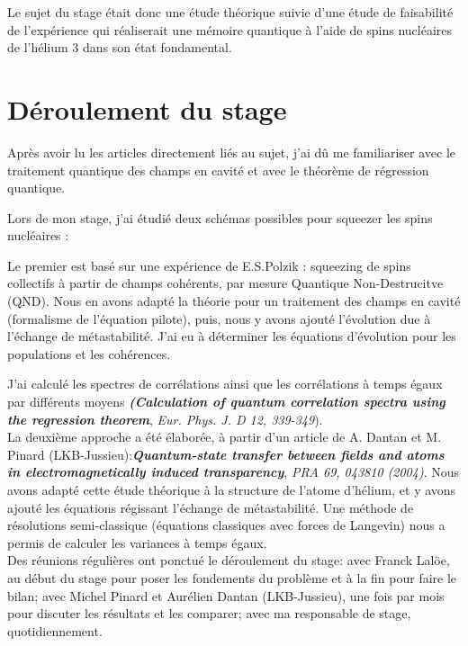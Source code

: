 \documentclass[a4paper,10pt]{article}
\begin{document}
Le sujet du stage \'{e}tait donc une \'{e}tude th\'{e}orique suivie d'une \'{e}tude de
faisabilit\'{e} de l'exp\'{e}rience qui r\'{e}aliserait une m\'{e}moire quantique \`{a} l'aide de
spins nucl\'{e}aires de l'h\'{e}lium 3 dans son \'{e}tat fondamental.


\section{D\'{e}roulement du stage}
Apr\`{e}s avoir lu les articles directement li\'{e}s au sujet, j'ai d\^{u} me familiariser
avec le traitement quantique des champs en cavit\'{e} et avec le th\'{e}or\`{e}me de
r\'{e}gression quantique.

Lors de mon stage, j'ai \'etudi\'e deux sch\'emas possibles pour squeezer les
spins nucl\'eaires :

Le premier est bas\'e sur une exp\'{e}rience de E.S.Polzik : squeezing
de spins collectifs \`{a} partir de champs coh\'{e}rents, par mesure Quantique
Non-Destrucitve (QND). 
Nous en avons adapt\'{e} la th\'{e}orie pour un traitement des
champs en cavit\'{e} (formalisme de l'\'{e}quation pilote), puis, nous y avons ajout\'{e}
l'\'{e}volution due \`{a} l'\'{e}change de m\'{e}tastabilit\'{e}. J'ai eu \`{a} d\'{e}terminer les
\'{e}quations d'\'{e}volution pour les populations et les coh\'{e}rences.

J'ai calcul\'{e} les spectres de corr\'{e}lations ainsi que les corr\'{e}lations \`{a} temps
\'{e}gaux par diff\'{e}rents moyens \textit{\textbf{(Calculation of quantum correlation
spectra using the regression theorem}}, \textit{Eur. Phys. J. D 12, 339-349}).\\

La deuxi\`eme approche a \'{e}t\'{e} \'elabor\'ee, \`{a} partir d'un article de
A. Dantan et M. Pinard (LKB-Jussieu):\textbf{\textit{Quantum-state transfer
between fields and atoms in electromagnetically induced transparency}},
\textit{PRA 69, 043810 (2004)}. Nous avons adapt\'{e} cette \'{e}tude th\'{e}orique \`{a} la
structure de l'atome d'h\'{e}lium, et y avons ajout\'{e} les \'{e}quations r\'{e}gissant
l'\'{e}change de m\'{e}tastabilit\'{e}.
Une m\'{e}thode de r\'{e}solutions semi-classique (\'{e}quations classiques avec forces de
Langevin) nous a permis de calculer les variances \`{a} temps \'{e}gaux.\\

Des r\'{e}unions r\'{e}guli\`{e}res ont ponctu\'{e} le d\'{e}roulement du stage: avec Franck Lal\"{o}e,
au d\'{e}but du stage pour poser les fondements du probl\`{e}me et \`{a} la fin pour faire
le bilan; avec Michel Pinard et Aur\'elien Dantan (LKB-Jussieu), une fois par mois pour
discuter les r\'{e}sultats et les comparer; avec ma responsable de stage,
quotidiennement.
\end{document}

